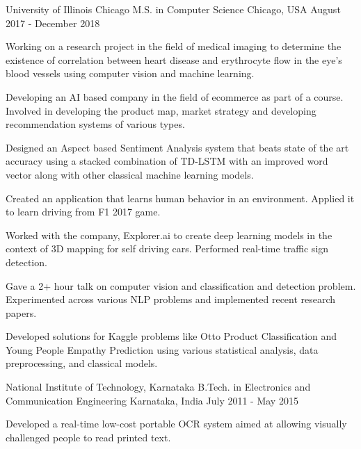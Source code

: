 

\begin{cventries}

  \cventry
    {University of Illinois Chicago} %
    {M.S. in Computer Science} %
    {Chicago, USA} %
    {August 2017 - December 2018} %
    {
      \begin{cvitems} %
        \item {Working on a research project in the field of medical imaging to determine the existence of correlation between heart disease and erythrocyte flow in the eye's blood vessels using computer vision and machine learning.}
        \item {Developing an AI based company in the field of ecommerce as part of a course. Involved in developing the product map, market strategy and developing recommendation systems of various types.}
        \item {Designed an Aspect based Sentiment Analysis system that beats state of the art accuracy using a stacked combination of TD-LSTM with an improved word vector along with other classical machine learning models.}
        \item {Created an application that learns human behavior in an environment. Applied it to learn driving from F1 2017 game.}
        \item {Worked with the company, Explorer.ai to create deep learning models in the context of 3D mapping for self driving cars. Performed real-time traffic sign detection.}
        \item {Gave a 2+ hour talk on computer vision and classification and detection problem. Experimented across various NLP problems and implemented recent research papers.}
        \item {Developed solutions for Kaggle problems like Otto Product Classification and Young People Empathy Prediction using various statistical analysis, data preprocessing, and classical models.}
      \end{cvitems}
    }

  \cventry
    {National Institute of Technology, Karnataka} %
    {B.Tech. in Electronics and Communication Engineering} %
    {Karnataka, India} %
    {July 2011 - May 2015} %
    {
      \begin{cvitems} %
        \item {Developed a real-time low-cost portable OCR system aimed at allowing visually challenged people to read printed text.}
      \end{cvitems}
    }

\end{cventries}
